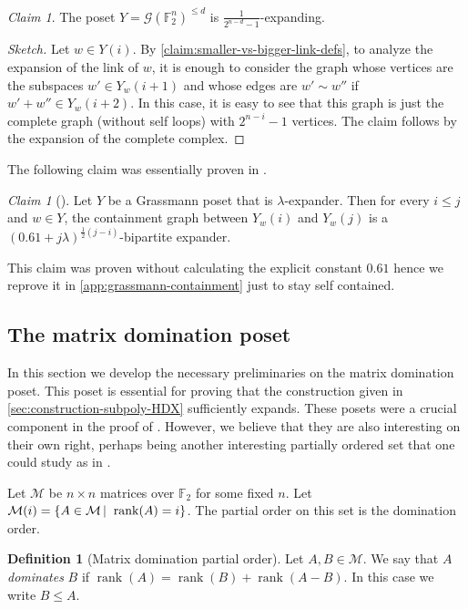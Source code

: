 \documentclass[10pt,a4paper]{article}
\newcommand{\prettyref}[1]{\cref{#1}}
\theoremstyle{definition}
\newtheorem{definition}[theorem]{Definition}
\theoremstyle{remark}
\newtheorem{claim}[theorem]{Claim}
\newcommand\sett[2]{\left\{ #1 \left| \; \vphantom{#1 #2} \right. #2  \right\}}
\newcommand{\F}{\mathbb{F}}
\DeclareMathOperator{\rank}{rank}
\renewcommand{\leq}{\leqslant}
\numberwithin{equation}{section}
\let\pref=\prettyref
\def\Gr{\mathcal{G}}
\def\Y{Y}
\def\MP{\mathcal{M}}
\begin{document}
\begin{claim} \label{claim:link-in-Grassmann-expands}
    The poset \(\Y = \Gr(\F_2^n)^{\leq d}\) is \(\frac{1}{2^{n-d}-1}\)-expanding.
\end{claim}
\begin{proof}[Sketch]
    Let \(w \in \Y(i)\). By \pref{claim:smaller-vs-bigger-link-defs}, to analyze the expansion of the link of \(w\), it is enough to consider the graph whose vertices are the subspaces \(w' \in \Y_{w}(i+1)\) and whose edges are \(w' \sim w''\) if \(w' + w'' \in \Y_w (i+2)\). In this case, it is easy to see that this graph is just the complete graph (without self loops) with \(2^{n-i}-1\) vertices. The claim follows by the expansion of the complete complex.
\end{proof}

The following claim was essentially proven in \cite{DiksteinDFH2018}.
\begin{claim}[\cite{DiksteinDFH2018}] \label{claim:loc-to-glob-grassmann}
    Let \(\Y\) be a Grassmann poset that is \(\lambda\)-expander. Then for every \(i \leq j\) and \(w \in \Y\), the containment graph between \(\Y_w(i)\) and \(\Y_w(j)\) is a \(\left (0.61 + j\lambda \right )^{\frac{1}{2}(j-i)}\)-bipartite expander.%
\end{claim}
This claim was proven \cite{DiksteinDFH2018} without calculating the explicit constant \(0.61\) hence we reprove it in \pref{app:grassmann-containment} just to stay self contained.

\subsection{The matrix domination poset} \label{sec:def-of-domination-relation}
In this section we develop the necessary preliminaries on the matrix domination poset. This poset is essential for proving that the construction given in \pref{sec:construction-subpoly-HDX} sufficiently expands. These posets were a crucial component in the proof of \cite{Golowich2023}. However, we believe that they are also interesting on their own right, perhaps being another interesting partially ordered set that one could study as in \cite{DiksteinDFH2018,kaufmanT2021garland}.

Let \(\MP\) be \(n \times n\) matrices over \(\F_2\) for some fixed \(n\). Let \(\MP(i) = \sett{A \in \MP}{\rank(A) = i}\). The partial order on this set is the domination order.
\begin{definition}[Matrix domination partial order]
    Let \(A,B \in \MP\). We say that \(A\) \emph{dominates} \(B\) if \(\rank(A) = \rank(B) + \rank(A-B)\). In this case we write \(B \leq A\).
\end{definition}
\end{document}
